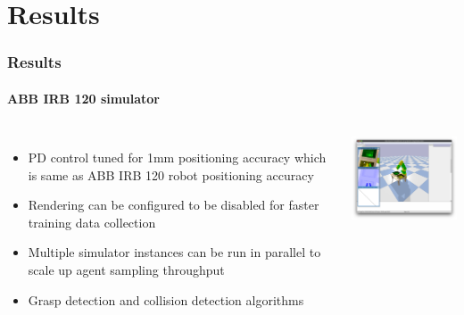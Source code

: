 \documentclass{beamer}
\begin{document}
	\section{Results}
	\begin{frame}
		\frametitle{Results}
		\framesubtitle{ABB IRB 120 simulator}
		
		\begin{columns}[c]
			\begin{itemize}
				\item PD control tuned for 1mm positioning accuracy which is same as ABB IRB 120 robot positioning accuracy
				\item Rendering can be configured to be disabled for faster training data collection
				\item Multiple simulator instances can be run in parallel to scale up agent sampling throughput
				\item Grasp detection and collision detection algorithms
			\end{itemize}
			
			\includegraphics[width=6cm]{simulator.png}
		\end{columns}
	\end{frame}
\end{document}
